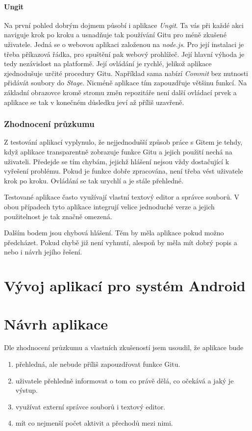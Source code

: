    \subsubsection{Ungit}
    Na první pohled dobrým dojmem působí i aplikace \emph{Ungit}. Ta vás při každé akci naviguje krok po kroku a usnadňuje tak používání Gitu pro méně zkušené uživatele. Jedná se o webovou aplikaci založenou na \emph{node.js}. Pro její instalaci je třeba příkazová řádka, pro spuštění pak webový prohlížeč. Její hlavní výhoda je tedy nezávislost na platformě. Její ovládání je rychlé, jelikož aplikace zjednodušuje určité procedury Gitu. Například sama nabízí \emph{Commit} bez nutnosti přidávát soubory do \emph{Stage}. Nicméně aplikace tím zapouzdřuje většinu funkcí. Na základní obrazovce kromě stromu změn repozitáře není další ovládací prvek a aplikace se tak v konečném důsledku jeví až příliš uzavřeně.

    \subsection{Zhodnocení průzkumu}
    Z testování aplikací vyplynulo, že nejjednodušší způsob práce s Gitem je tehdy, když aplikace transparentně zobrazuje funkce Gitu a jejich použití nechá na uživateli. Předejde se tím chybám, jejichž hlášení nejsou vždy dostačující k vyřešení problému. Pokud je funkce dobře zpracována, není třeba vést uživatele krok po kroku. Ovládání se tak urychlí a je stále přehledné.

    Testované aplikace často využívají vlastní textový editor a správce souborů. V obou případech tyto aplikace integrují velice jednoduché verze a jejich použitelnost je tak značně omezená.

    Dalším bodem jsou chybová hlášení. Těm by měla aplikace pokud možno předcházet. Pokud chybě již není vyhnutí, alespoň by měla mít dobrý popis a nebo i návrh jejího řešení.

\chapter{Vývoj aplikací pro systém Android}

\chapter{Návrh aplikace}
    Dle zhodnocení průzkumu a vlastních zkušeností jsem usoudil, že aplikace bude
    \begin{enumerate}
        \item přehledná, ale nebude příliš zapouzdřovat funkce Gitu.
        \item uživatele přehledně informovat o tom co právě dělá, co očekává a jaký je výstup.
        \item využívat externí správce souborů i textový editor.
        \item mít co nejmenší počet aktivit a přechodů mezi nimi.
    \end{enumerate}

